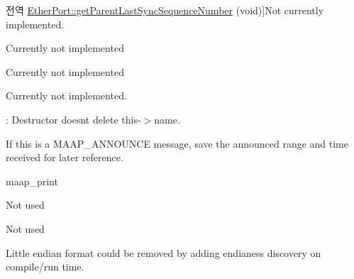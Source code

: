 \begin{DoxyRefList}
\hypertarget{todo__todo000024}{}%
전역 \hyperlink{class_ether_port_a309b5999e389c2c63a6032acdd8f3a9b}{Ether\+Port\+:\+:get\+Parent\+Last\+Sync\+Sequence\+Number} (void)]Not currently implemented.  
\item[\label{todo__todo000022}%
\hypertarget{todo__todo000022}{}%
전역 \hyperlink{class_ether_port_acd1c1bf1471198e12a9ebe3496a8e9dc}{Ether\+Port\+:\+:remove\+Foreign\+Master} (\hyperlink{class_p_t_p_message_announce}{P\+T\+P\+Message\+Announce} $\ast$msg)]Currently not implemented  
\item[\label{todo__todo000023}%
\hypertarget{todo__todo000023}{}%
전역 \hyperlink{class_ether_port_ad78513a360e8accfa86b24cee34725d1}{Ether\+Port\+:\+:remove\+Foreign\+Master\+All} (void)]Currently not implemented  
\item[\label{todo__todo000025}%
\hypertarget{todo__todo000025}{}%
전역 \hyperlink{class_ether_port_a28bf1e013d3f79704f09fe9fb0027d01}{Ether\+Port\+:\+:set\+Parent\+Last\+Sync\+Sequence\+Number} (uint16\+\_\+t num)]Currently not implemented.  
\item[\label{todo__todo000019}%
\hypertarget{todo__todo000019}{}%
클래스 \hyperlink{class_interface_name}{Interface\+Name} ]\+: Destructor doesnt delete this-\/$>$name.  
\item[\label{todo__todo000032}%
\hypertarget{todo__todo000032}{}%
전역 \hyperlink{maap_8h_a7807b60e9a515b68da136756773bd576}{maap\+\_\+handle\+\_\+packet} (\hyperlink{struct_maap___client}{Maap\+\_\+\+Client} $\ast$mc, const uint8\+\_\+t $\ast$stream, int len)]If this is a M\+A\+A\+P\+\_\+\+A\+N\+N\+O\+U\+N\+CE message, save the announced range and time received for later reference.  
\item[\label{todo__todo000014}%
\hypertarget{todo__todo000014}{}%
그룹 \hyperlink{group__maap__print}{maap\+\_\+print} ]maap\+\_\+print  
\item[\label{todo__todo000016}%
\hypertarget{todo__todo000016}{}%
전역 \hyperlink{avbts__message_8hpp_a79ce0da79d25fb5a0f472fefb2ac7a51}{P\+T\+P\+\_\+\+D\+E\+F\+A\+U\+LT} ]Not used  
\item[\label{todo__todo000015}%
\hypertarget{todo__todo000015}{}%
전역 \hyperlink{avbts__message_8hpp_aeb44485d3b9e78204cb44ffcf565f87f}{P\+T\+P\+\_\+\+E\+T\+H\+ER} ]Not used  
\item[\label{todo__todo000017}%
\hypertarget{todo__todo000017}{}%
전역 \hyperlink{class_p_t_p_message_common_a9930feb44509700c6a81aa4e747357ca}{P\+T\+P\+Message\+Common\+:\+:get\+Correction\+Field} (void)]Little endian format could be removed by adding endianess discovery on compile/run time.  

\end{DoxyRefList}
